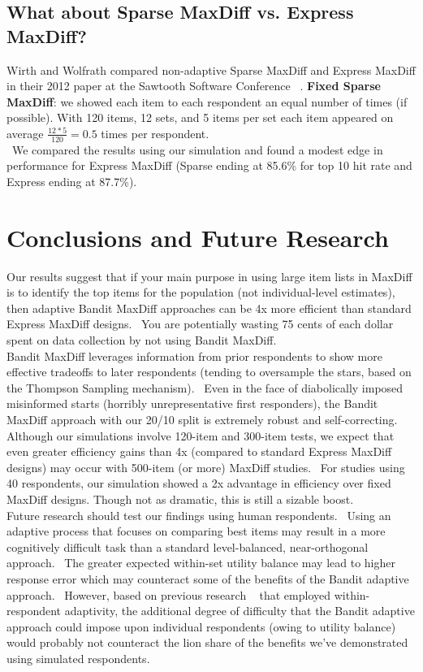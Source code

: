 \documentclass[nonblindrev]{informs3}
\begin{document}
\subsection{What about Sparse MaxDiff vs. Express MaxDiff?}
Wirth and Wolfrath compared non-adaptive Sparse MaxDiff and Express MaxDiff in their 2012 paper at the Sawtooth Software Conference ~\cite{wirth2012largeset}. 
\textbf{Fixed Sparse MaxDiff}: we showed each item to each respondent an equal number of times (if possible).  With 120 items, 12 sets, and 5 items per set each item appeared on average $\frac{12*5}{120} = 0.5$ times per respondent. \\
 We compared the results using our simulation and found a modest edge in performance for Express MaxDiff (Sparse ending at 85.6\% for top 10 hit rate and Express ending at 87.7\%).
\section{Conclusions and Future Research}
Our results suggest that if your main purpose in using large item lists in MaxDiff is to identify the top items for the population (not individual-level estimates), then adaptive Bandit MaxDiff approaches can be 4x more efficient than standard Express MaxDiff designs.  You are potentially wasting 75 cents of each dollar spent on data collection by not using Bandit MaxDiff.\\
Bandit MaxDiff leverages information from prior respondents to show more effective tradeoffs to later respondents (tending to oversample the stars, based on the Thompson Sampling mechanism).  Even in the face of diabolically imposed misinformed starts (horribly unrepresentative first responders), the Bandit MaxDiff approach with our 20/10 split is extremely robust and self-correcting.\\
Although our simulations involve 120-item and 300-item tests, we expect that even greater efficiency gains than 4x (compared to standard Express MaxDiff designs) may occur with 500-item (or more) MaxDiff studies.  For studies using 40 respondents, our simulation showed a 2x advantage in efficiency over fixed MaxDiff designs. Though not as dramatic, this is still a sizable boost.\\
Future research should test our findings using human respondents.  Using an adaptive process that focuses on comparing best items may result in a more cognitively difficult task than a standard level-balanced, near-orthogonal approach.  The greater expected within-set utility balance may lead to higher response error which may counteract some of the benefits of the Bandit adaptive approach.  However, based on previous research ~\cite{orme2006adaptive} that employed within-respondent adaptivity, the additional degree of difficulty that the Bandit adaptive approach could impose upon individual respondents (owing to utility balance) would probably not counteract the lion share of the benefits we've demonstrated using simulated respondents.\\
\end{document}
